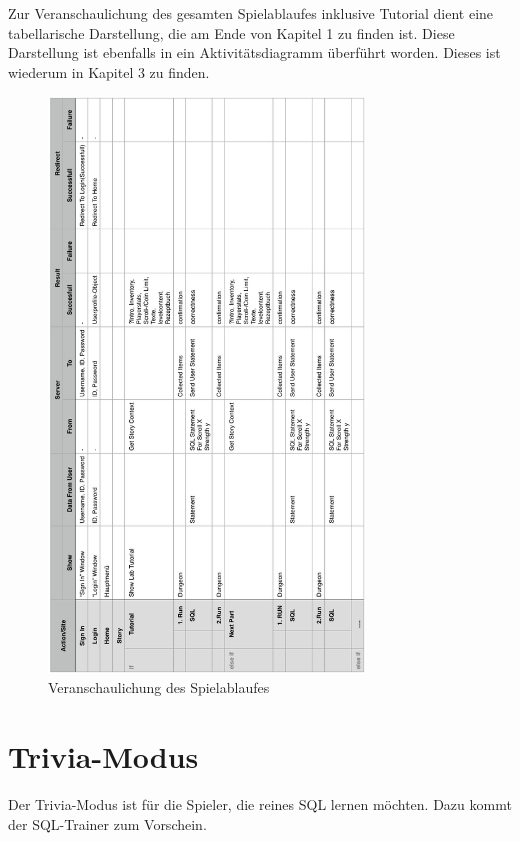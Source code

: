 Zur Veranschaulichung des gesamten Spielablaufes inklusive Tutorial dient eine tabellarische Darstellung, die am Ende von Kapitel 1 zu finden ist. 
Diese Darstellung ist ebenfalls in ein Aktivit\"atsdiagramm \"uberf\"uhrt worden. Dieses ist wiederum in Kapitel 3 zu finden.

\begin{figure}[ht]
\centering
\includegraphics[width=0.75\textwidth]{figures/Spielablauf.PNG}
\caption{Veranschaulichung des Spielablaufes}
\end{figure}

\section{Trivia-Modus}
Der Trivia-Modus ist f\"ur die Spieler, die reines SQL lernen m\"ochten. Dazu kommt der SQL-Trainer zum Vorschein.   

